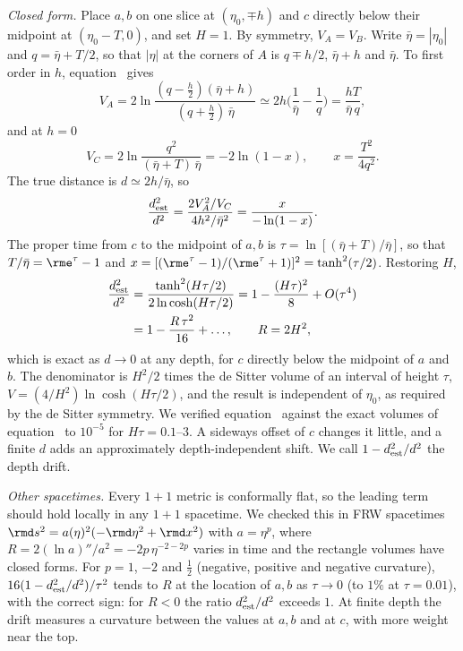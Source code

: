 \documentclass[12pt]{iopart}
\begin{document}
\emph{Closed form.} Place $a,b$ on one slice at $(\eta_0,\mp h)$ and $c$ directly below their midpoint at $(\eta_0-T,0)$, and set $H=1$. By symmetry, $V_A=V_B$. Write $\bar\eta=|\eta_0|$ and $q=\bar\eta+T/2$, so that $|\eta|$ at the corners of $A$ is $q\mp h/2$, $\bar\eta+h$ and $\bar\eta$. To first order in $h$, equation~ gives
\begin{equation}
V_A=2\ln\frac{(q-\tfrac h2)(\bar\eta+h)}{(q+\tfrac h2)\,\bar\eta}\simeq2h\Big(\frac1{\bar\eta}-\frac1q\Big)=\frac{hT}{\bar\eta\,q},
\end{equation}
and at $h=0$
\begin{equation}
V_C=2\ln\frac{q^2}{(\bar\eta+T)\,\bar\eta}=-2\ln(1-x),\qquad x=\frac{T^2}{4q^2}.
\end{equation}
The true distance is $d\simeq2h/\bar\eta$, so
\begin{equation}
\frac{d^2_{\rm est}}{d^2}=\frac{2V_A^2/V_C}{4h^2/\bar\eta^2}=\frac{x}{-\ln(1-x)}.
\end{equation}
The proper time from $c$ to the midpoint of $a,b$ is $\tau=\ln[(\bar\eta+T)/\bar\eta]$, so that $T/\bar\eta=\rme^{\tau}-1$ and $x=[(\rme^\tau-1)/(\rme^\tau+1)]^2=\tanh^2(\tau/2)$. Restoring $H$,
\begin{equation}
\begin{aligned}
\frac{d^2_{\rm est}}{d^2}&=\frac{\tanh^2(H\tau/2)}{2\ln\cosh(H\tau/2)}=1-\frac{(H\tau)^2}{8}+O(\tau^4)\\
&=1-\frac{R\,\tau^2}{16}+\dots,\qquad R=2H^2,
\end{aligned}
\label{eq:drift}
\end{equation}
which is exact as $d\to0$ at any depth, for $c$ directly below the midpoint of $a$ and $b$. The denominator is $H^2/2$ times the de Sitter volume of an interval of height $\tau$, $V=(4/H^2)\ln\cosh(H\tau/2)$, and the result is independent of $\eta_0$, as required by the de Sitter symmetry. We verified equation~ against the exact volumes of equation~ to $10^{-5}$ for $H\tau=0.1$--$3$. A sideways offset of $c$ changes it little, and a finite $d$ adds an approximately depth-independent shift. We call $1-d^2_{\rm est}/d^2$ the depth drift.

\emph{Other spacetimes.} Every $1+1$ metric is conformally flat, so the leading term should hold locally in any $1+1$ spacetime. We checked this in FRW spacetimes $\rmd s^2=a(\eta)^2(-\rmd\eta^2+\rmd x^2)$ with $a=\eta^p$, where $R=2(\ln a)''/a^2=-2p\,\eta^{-2-2p}$ varies in time and the rectangle volumes have closed forms. For $p=1$, $-2$ and $\tfrac12$ (negative, positive and negative curvature), $16(1-d^2_{\rm est}/d^2)/\tau^2$ tends to $R$ at the location of $a,b$ as $\tau\to0$ (to $1\%$ at $\tau=0.01$), with the correct sign: for $R<0$ the ratio $d^2_{\rm est}/d^2$ exceeds $1$. At finite depth the drift measures a curvature between the values at $a,b$ and at $c$, with more weight near the top.
\end{document}
